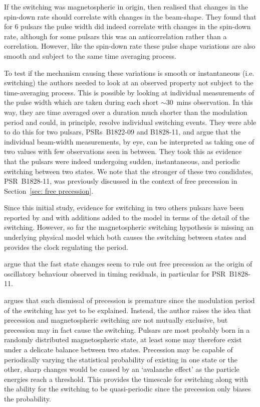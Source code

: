 If the switching was magnetospheric in origin, then \citet{Lyne2010} realised
that changes in the spin-down rate should correlate with changes in the
beam-shape.  They found that for 6 pulsars the pulse width did indeed correlate
with changes in the spin-down rate, although for some pulsars this was an
anticorrelation rather than a correlation. However, like the spin-down rate
these pulse shape variations are also smooth and subject to the same time
averaging process. 

To test if the mechanism causing these variations is smooth or instantaneous
(i.e. switching) the authors needed to look at an observed property not subject
to the time-averaging process.  This is possible by looking at individual
measurements of the pulse width which are taken during each short $\sim30$~mins
observation. In this way, they are time averaged over a duration much shorter
than the modulation period and could, in principle, resolve individual
switching events. They were able to do this for two pulsars, PSRs~B1822-09 and
B1828-11, and argue that the individual beam-width measurements, by eye, can be
interpreted as taking one of two values with few observations seen in between.
They took this as evidence that the pulsars were indeed undergoing sudden,
instantaneous, and periodic switching between two states. We note that the
stronger of these two condidates, PSR~B1828-11, was previously discussed in the
context of free precession in Section~\ref{sec: free precession}.

Since this initial study, evidence for switching in two others pulsars have
been reported by \citet{Perera2014} and \citet{Perera2016} with additions added
to the model in terms of the detail of the switching. However, so far the
magnetospheric switching hypothesis is missing an underlying physical model
which both causes the switching between states and provides the clock regulating
the period.

\citet{Lyne2010} argue that the fast state changes seem to rule out free
precession as the origin of oscillatory behaviour observed in timing residuals,
in particular for PSR~B1828-11.

\citet{Jones2012} argues that such dismissal of precession is premature since
the modulation period of the switching has yet to be explained.  Instead, the
author raises the idea that precession and magnetospheric switching are not
mutually exclusive, but precession may in fact cause the switching. Pulsars are
most probably born in a randomly distributed magnetospheric state, at least
some may therefore exist under a delicate balance between two states.
Precession may be capable of periodically varying the statistical probability
of existing in one state or the other, sharp changes would be caused by an
`avalanche effect' as the particle energies reach a threshold.  This provides
the timescale for switching along with the ability for the switching to be
quasi-periodic since the precession only biases the probability.


